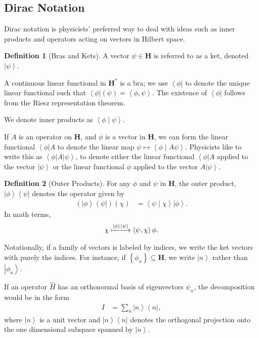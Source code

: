 \documentclass[10pt]{extarticle}
\newcommand{\bra}[1]{\left\langle#1\right\vert}
\newcommand{\ket}[1]{\left\vert#1\right\rangle}
\newcommand{\braket}[2]{\left\langle#1\mid#2\right\rangle}
\newcommand{\set}[1]{\left\{#1\right\}}
\newcommand{\iprod}[2]{\left\langle #1,#2\right\rangle}
\theoremstyle{plain}
\theoremstyle{definition}
\newtheorem*{definition}{Definition}
\theoremstyle{remark}
\renewcommand{\newline}{\hfill\break}
\begin{document}
  \subsection{Dirac Notation}%
  Dirac notation is physicists' preferred way to deal with ideas such as inner products and operators acting on vectors in Hilbert space.
  \begin{definition}[Bras and Kets]
    A vector $\psi\in \mathbf{H}$ is referred to as a ket, denoted $\ket{\psi}$.\newline

    A continuous linear functional in $\mathbf{H}^{\ast}$ is a bra; we use $\bra{\phi}$ to denote the unique linear functional such that $\bra{\phi}(\psi) = \iprod{\phi}{\psi}$. The existence of $\bra{\phi}$ follows from the Riesz representation theorem.\newline

    We denote inner products as $\braket{\phi}{\psi}$.
  \end{definition}
  If $A$ is an operator on $\mathbf{H}$, and $\phi$ is a vector in $\mathbf{H}$, we can form the linear functional $\bra{\phi}A$ to denote the linear map $\psi \mapsto \braket{\phi}{A\psi}$. Physicists like to write this as $\bra{\phi} A \ket{\psi}$, to denote either the linear functional $\bra{\phi}A$ applied to the vector $\ket{\psi}$ or the linear functional $\phi$ applied to the vector $A\ket{\psi}$.
  \begin{definition}[Outer Products]
    For any $\phi$ and $\psi$ in $\mathbf{H}$, the outer product, $\ket{\phi}\bra{\psi}$ denotes the operator given by
    \begin{align*}
      \left(\ket{\phi}\bra{\psi}\right)(\chi) &= \braket{\psi}{\chi} \ket{\phi}.
    \end{align*}
    In math terms,
    \begin{align*}
      \chi \xmapsto{\ket{\phi}\bra{\psi}}\iprod{\psi}{\chi}\phi.
    \end{align*}
  \end{definition}
  Notationally, if a family of vectors is labeled by indices, we write the ket vectors with purely the indices. For instance, if $\set{\phi_{n}}\subseteq \mathbf{H}$, we write $\ket{n}$ rather than $\ket{\phi_n}$.\newline

  If an operator $\hat{H}$ has an orthonormal basis of eigenvectors $\psi_n$, the decomposition would be in the form
  \begin{align*}
    I &= \sum_{n}\ket{n}\bra{n},
  \end{align*}
  where $\ket{n}$ is a unit vector and $\ket{n}\bra{n}$ denotes the orthogonal projection onto the one dimensional subspace spanned by $\ket{n}$.\newline
\end{document}

